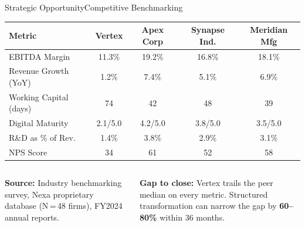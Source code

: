 \begin{frame}{Strategic Opportunity}{Competitive Benchmarking}
  \vspace{0.2cm}
  \small
  \begin{center}
  \begin{tabular}{lcccc}
    \toprule
    \rowcolor{NexaNavy}
    \textcolor{NexaWhite}{\textbf{Metric}} &
    \textcolor{NexaWhite}{\textbf{Vertex}} &
    \textcolor{NexaWhite}{\textbf{Apex Corp}} &
    \textcolor{NexaWhite}{\textbf{Synapse Ind.}} &
    \textcolor{NexaWhite}{\textbf{Meridian Mfg}} \\
    \midrule
    EBITDA Margin        & 11.3\%  & 19.2\%  & 16.8\%  & 18.1\%  \\
    \rowcolor{NexaLight}
    Revenue Growth (YoY) & 1.2\%   & 7.4\%   & 5.1\%   & 6.9\%   \\
    Working Capital (days)& 74      & 42      & 48      & 39      \\
    \rowcolor{NexaLight}
    Digital Maturity     & 2.1/5.0 & 4.2/5.0 & 3.8/5.0 & 3.5/5.0 \\
    R\&D as \% of Rev.   & 1.4\%   & 3.8\%   & 2.9\%   & 3.1\%   \\
    \rowcolor{NexaLight}
    NPS Score            & 34      & 61      & 52      & 58      \\
    \bottomrule
  \end{tabular}
  \end{center}
  \vspace{0.25cm}
  \begin{columns}[T]
      \textcolor{NexaSlate}{\scriptsize
        \textbf{Source:} Industry benchmarking survey,
        Nexa proprietary database (N\,=\,48 firms),
        FY2024 annual reports.}
      \begin{tcolorbox}[nexahighlight, top=3pt, bottom=3pt]
        \scriptsize\textbf{Gap to close:} Vertex trails the
        peer median on every metric. Structured
        transformation can narrow the gap by \textbf{60--80\%}
        within 36 months.
      \end{tcolorbox}
  \end{columns}
\end{frame}
